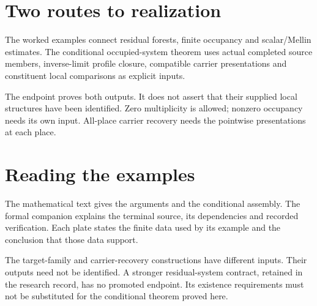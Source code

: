 \documentclass[12pt,a4paper]{article}
\begin{document}
\KomorebiCover
{}

\section*{Two routes to realization}
The worked examples connect residual forests, finite occupancy and scalar/Mellin estimates. The conditional occupied-system theorem uses actual completed source members, inverse-limit profile closure, compatible carrier presentations and constituent local comparisons as explicit inputs.
\begin{center}
\end{center}
The endpoint proves both outputs. It does not assert that their supplied local structures have been identified. Zero multiplicity is allowed; nonzero occupancy needs its own input. All-place carrier recovery needs the pointwise presentations at each place.
\clearpage
\section*{Reading the examples}
The mathematical text gives the arguments and the conditional assembly. The
formal companion explains the terminal source, its dependencies and recorded
verification. Each plate states the finite data used by its example and the
conclusion that those data support.

The target-family and carrier-recovery constructions have different inputs.
Their outputs need not be identified. A stronger residual-system contract,
retained in the research record, has no promoted endpoint. Its existence
requirements must not be substituted for the conditional theorem proved here.
\clearpage
\setcounter{page}{1}\renewcommand{\thepage}{\arabic{page}}

\end{document}
